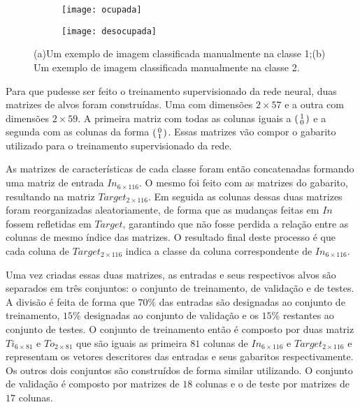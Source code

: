 \begin{figure}
\centering
\begin{subfigure}{.1\textwidth}
  \centering
  \texttt{[image: ocupada]}
  \caption{}
  \label{fig:exemploRede:sub:ocupada}
\end{subfigure}%
\begin{subfigure}{.1\textwidth}
  \centering
  \texttt{[image: desocupada]}
  \caption{}
  \label{fig:exemploRede:sub:desocupada}
\end{subfigure}
\centering
\caption{(a)Um exemplo de imagem classificada manualmente na classe 1;(b) Um exemplo de imagem classificada manualmente na classe 2.}
\label{fig:exemploRede}
\end{figure}

Para que pudesse ser feito o treinamento supervisionado da rede neural, duas matrizes de alvos foram construídas. Uma com dimensões $2\times 57$ e a outra com dimensões $2\times 59$. A primeira matriz com todas as colunas iguais a $\begin{psmallmatrix}1\\0\end{psmallmatrix}$ e a segunda com as colunas da forma $\begin{psmallmatrix}0\\1\end{psmallmatrix}$. Essas matrizes vão compor o gabarito utilizado para o treinamento supervisionado da rede.

As matrizes  de características de cada classe foram então concatenadas formando uma matriz de entrada $In_{6\times 116}$. O mesmo foi feito com as matrizes do gabarito, resultando na matriz $Target_{2\times 116}$. Em seguida as colunas dessas duas matrizes foram reorganizadas aleatoriamente, de forma que as mudanças feitas em $In$ fossem refletidas em $Target$, garantindo que não fosse perdida a relação entre as colunas de mesmo índice das matrizes. O resultado final deste processo é que cada coluna de $Target_{2\times 116}$ indica a classe da coluna correspondente de $In_{6\times 116}$.

Uma vez criadas essas duas matrizes, as entradas e seus respectivos alvos são separados em três conjuntos: o conjunto de treinamento, de validação e de testes. A divisão é feita de forma que $70\%$ das entradas são designadas ao conjunto de treinamento, $15\%$ designadas ao conjunto de validação e os $15\%$ restantes ao conjunto de testes. O conjunto de treinamento então é composto por duas matriz $Ti_{6\times 81}$ e $To_{2\times 81}$ que são iguais as primeira $81$ colunas de $In_{6\times 116}$ e $Target_{2\times 116}$ e representam os vetores descritores das entradas e seus gabaritos respectivamente. Os outros dois conjuntos são construídos de forma similar utilizando. O conjunto de validação é composto por matrizes de $18$ colunas e o de teste por matrizes de $17$ colunas.


